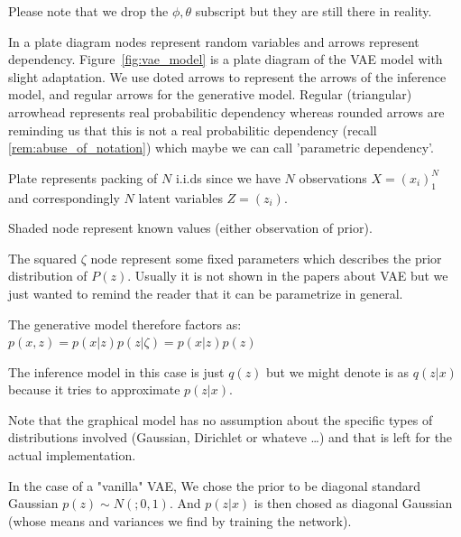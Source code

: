 \documentclass[11pt, a4paper]{report}
\theoremstyle{plain}
\theoremstyle{definition}
\theoremstyle{remark}
\begin{document}
Please note that we drop the $\phi, \theta$ subscript but they are still there
in reality.

In a plate diagram nodes represent random variables and arrows
represent dependency.
Figure~\ref{fig:vae_model} is a plate diagram of the VAE model with slight
adaptation. We use doted arrows to represent the arrows of the inference model,
and regular arrows for the generative model. Regular (triangular) arrowhead
represents real probabilitic dependency whereas rounded arrows are reminding us
that this is not a real probabilitic dependency (recall
\ref{rem:abuse_of_notation}) which maybe we can call 'parametric
dependency'.

Plate represents packing of $N$ i.i.ds since we have $N$ observations $X =
(x_i)_1^N$ and correspondingly $N$ latent variables $Z = (z_i)$.

Shaded node represent known values (either observation of prior).

The squared $\zeta$ node represent some fixed parameters which describes the
prior distribution of $P(z)$. Usually it is not shown in the papers about VAE
but we just wanted to remind the reader that it can be parametrize in general.

The generative model therefore factors as: $p(x,z) = p(x|z)p(z|\zeta) =
p(x|z)p(z)$

The inference model in this case is just $q(z)$ but we might denote is as
$q(z|x)$ because it tries to approximate $p(z|x)$.

Note that the graphical model has no assumption about the specific types of
distributions involved (Gaussian, Dirichlet or whateve \dots) and that is left
for the actual implementation.

In the case of a "vanilla" VAE, We chose the prior to be diagonal standard Gaussian
$p(z) \sim N(;0,1)$. And $p(z | x)$ is then chosed as diagonal Gaussian (whose
means and variances we find by training the network).
\end{document}
